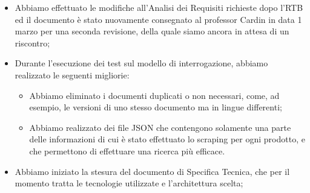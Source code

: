 \begin{itemize}
    \item Abbiamo effettuato le modifiche all'Analisi dei Requisiti richieste dopo l'RTB ed il documento è stato nuovamente consegnato al professor Cardin in data 1 marzo per una seconda revisione, della quale siamo ancora in attesa di un riscontro;
    \item Durante l'esecuzione dei test sul modello di interrogazione, abbiamo realizzato le seguenti migliorie:
    \begin{itemize}
        \item Abbiamo eliminato i documenti duplicati o non necessari, come, ad esempio, le versioni di uno stesso documento ma in lingue differenti;
        \item Abbiamo realizzato dei file JSON che contengono solamente una parte delle informazioni di cui è stato effettuato lo scraping per ogni prodotto, e che permettono di effettuare una ricerca più efficace.
    \end{itemize}
    \item Abbiamo iniziato la stesura del documento di Specifica Tecnica, che per il momento tratta le tecnologie utilizzate e l'architettura scelta;
\end{itemize}